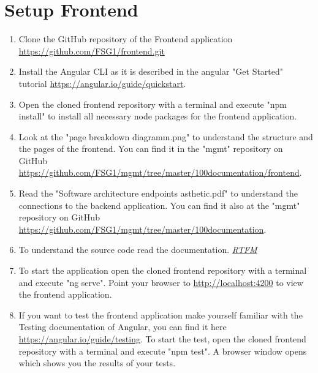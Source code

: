 \chapter{Setup Frontend}
\label{ch:frontend}

\begin{enumerate}
	\item Clone the GitHub repository of the Frontend application \url{https://github.com/FSG1/frontend.git}
	
	\item Install the Angular CLI as it is described in the angular "Get Started" tutorial \url{https://angular.io/guide/quickstart}.
	
	\item Open the cloned frontend repository with a terminal and execute "npm install" to install all necessary node packages for the frontend application.
	
	\item Look at the "page breakdown diagramm.png" to understand the structure and the pages of the frontend. You can find it in the "mgmt" repository on GitHub \url{https://github.com/FSG1/mgmt/tree/master/100documentation/frontend}.
	
	\item Read the "Software architecture endpoints asthetic.pdf" to understand the connections to the backend application. You can find it also at the "mgmt" repository on GitHub \url{https://github.com/FSG1/mgmt/tree/master/100documentation}.
	
	\item To understand the source code read the documentation. \href{https://en.wikipedia.org/wiki/RTFM}{\textit{RTFM}}
	
	\item To start the application open the cloned frontend repository with a terminal and execute "ng serve". Point your browser to \url{http://localhost:4200} to view the frontend application.
	
	\item If you want to test the frontend application make yourself familiar with the Testing documentation of Angular, you can find it here \url{https://angular.io/guide/testing}. To start the test, open the cloned frontend repository with a terminal and execute "npm test". A browser window opens which shows you the results of your tests.
\end{enumerate}

